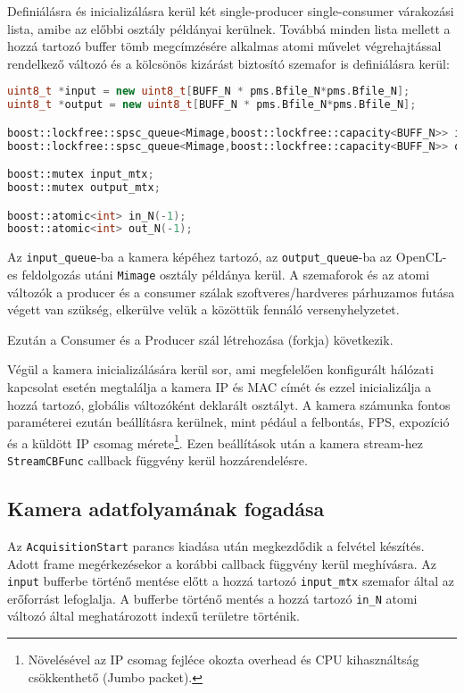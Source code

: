\noindent Definiálásra és inicializálásra kerül két single-producer single-consumer várakozási lista, amibe az előbbi osztály
példányai kerülnek. Továbbá minden lista mellett a hozzá tartozó buffer tömb megcímzésére alkalmas atomi művelet végrehajtással
rendelkező változó és a kölcsönös kizárást biztosító szemafor is definiálásra kerül:

\begin{lstlisting}[language=C++]
uint8_t *input = new uint8_t[BUFF_N * pms.Bfile_N*pms.Bfile_N];
uint8_t *output = new uint8_t[BUFF_N * pms.Bfile_N*pms.Bfile_N];

boost::lockfree::spsc_queue<Mimage,boost::lockfree::capacity<BUFF_N>> input_queue;
boost::lockfree::spsc_queue<Mimage,boost::lockfree::capacity<BUFF_N>> output_queue;

boost::mutex input_mtx;
boost::mutex output_mtx;

boost::atomic<int> in_N(-1);
boost::atomic<int> out_N(-1);
\end{lstlisting}

\noindent Az \texttt{input\_queue}-ba a kamera képéhez tartozó, az \texttt{output\_queue}-ba az OpenCL-es feldolgozás utáni
	\texttt{Mimage} osztály példánya kerül. A szemaforok és az atomi változók a producer és a consumer szálak szoftveres/hardveres
	párhuzamos futása végett van szükség, elkerülve velük a közöttük fennáló versenyhelyzetet.

	Ezután a Consumer és a Producer szál létrehozása (forkja) következik.
	
	Végül a kamera inicializálására kerül sor, ami megfelelően konfigurált hálózati kapcsolat esetén megtalálja a kamera IP és MAC
	címét és ezzel inicializálja a hozzá tartozó, globális változóként deklarált osztályt. A kamera számunka fontos paraméterei ezután
	beállításra kerülnek, mint pédául a felbontás, FPS, expozíció és a küldött IP csomag mérete\footnote{Növelésével az IP csomag
	fejléce okozta overhead és CPU kihasználtság csökkenthető (Jumbo packet).}.
	Ezen beállítások után a kamera stream-hez \texttt{StreamCBFunc} callback függvény kerül hozzárendelésre. 
	 
	\subsection*{Kamera adatfolyamának fogadása}
	Az \texttt{AcquisitionStart} parancs kiadása után megkezdődik a felvétel készítés. Adott frame megérkezésekor a korábbi callback
	függvény kerül meghívásra. Az \texttt{input} bufferbe történő mentése előtt a hozzá tartozó \texttt{input\_mtx}
	szemafor által az erőforrást lefoglalja. A bufferbe történő mentés a hozzá tartozó \texttt{in\_N} atomi változó által
	meghatározott indexű területre történik.
	
